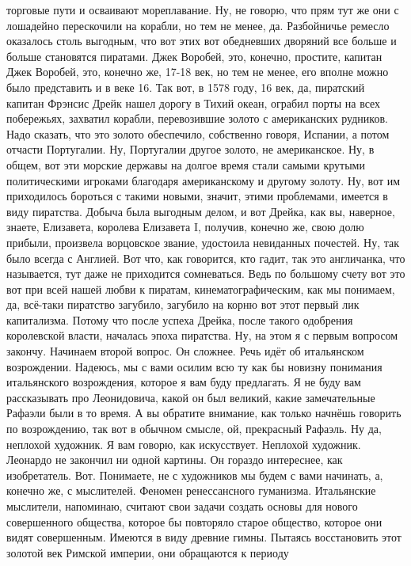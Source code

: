 торговые пути и осваивают мореплавание. Ну, не говорю, что прям тут же они с
лошадейно перескочили на корабли, но тем не менее, да. Разбойничье ремесло
оказалось столь выгодным, что вот этих вот обедневших дворяний все больше и
больше становятся пиратами. Джек Воробей, это, конечно, простите, капитан Джек
Воробей, это, конечно же, 17-18 век, но тем не менее, его вполне можно было
представить и в веке 16. Так вот, в 1578 году, 16 век, да, пиратский капитан
Фрэнсис Дрейк нашел дорогу в Тихий океан, ограбил порты на всех побережьях,
захватил корабли, перевозившие золото с американских рудников. Надо сказать, что
это золото обеспечило, собственно говоря, Испании, а потом отчасти Португалии.
Ну, Португалии другое золото, не американское. Ну, в общем, вот эти морские
державы на долгое время стали самыми крутыми политическими игроками благодаря
американскому и другому золоту. Ну, вот им приходилось бороться с такими новыми,
значит, этими проблемами, имеется в виду пиратства. Добыча была выгодным делом,
и вот Дрейка, как вы, наверное, знаете, Елизавета, королева Елизавета I,
получив, конечно же, свою долю прибыли, произвела ворцовское звание, удостоила
невиданных почестей. Ну, так было всегда с Англией. Вот что, как говорится, кто
гадит, так это англичанка, что называется, тут даже не приходится сомневаться.
Ведь по большому счету вот это вот при всей нашей любви к пиратам,
кинематографическим, как мы понимаем, да, всё-таки пиратство загубило, загубило
на корню вот этот первый лик капитализма. Потому что после успеха Дрейка, после
такого одобрения королевской власти, началась эпоха пиратства. Ну, на этом я с
первым вопросом закончу. Начинаем второй вопрос. Он сложнее. Речь идёт об
итальянском возрождении. Надеюсь, мы с вами осилим всю ту как бы новизну
понимания итальянского возрождения, которое я вам буду предлагать. Я не буду вам
рассказывать про Леонидовича, какой он был великий, какие замечательные Рафаэли
были в то время. А вы обратите внимание, как только начнёшь говорить по
возрождению, так вот в обычном смысле, ой, прекрасный Рафаэль. Ну да, неплохой
художник. Я вам говорю, как искусствует. Неплохой художник. Леонардо не закончил
ни одной картины. Он гораздо интереснее, как изобретатель. Вот. Понимаете, не с
художников мы будем с вами начинать, а, конечно же, с мыслителей. Феномен
ренессансного гуманизма. Итальянские мыслители, напоминаю, считают свои задачи
создать основы для нового совершенного общества, которое бы повторяло старое
общество, которое они видят совершенным. Имеются в виду древние гимны. Пытаясь
восстановить этот золотой век Римской империи, они обращаются к периоду
